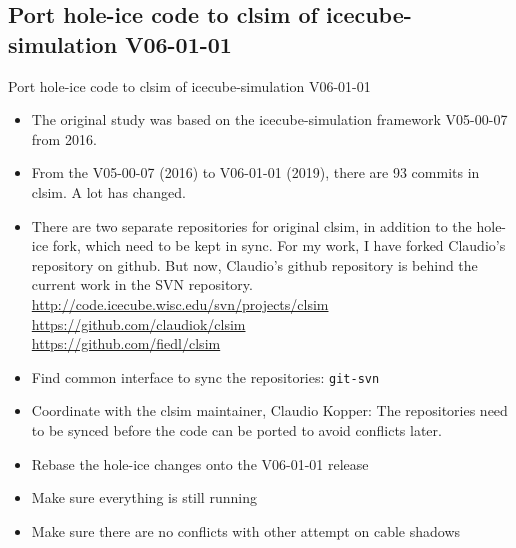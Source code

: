 \subsection{\inprogress Port hole-ice code to clsim of icecube-simulation V06-01-01}
\begin{frame}{\inprogress Port hole-ice code to clsim of icecube-simulation V06-01-01}
  \begin{itemize}
    \item The original study was based on the icecube-simulation framework V05-00-07 from 2016.
    \item From the V05-00-07 (2016) to V06-01-01 (2019), there are 93 commits in clsim. A lot has changed.
    \item There are two separate repositories for original clsim, in addition to the hole-ice fork, which need to be kept in sync. For my work, I have forked Claudio's repository on github. But now, Claudio's github repository is behind the current work in the SVN repository. \\
      \url{http://code.icecube.wisc.edu/svn/projects/clsim} \\
      \url{https://github.com/claudiok/clsim} \\
      \url{https://github.com/fiedl/clsim}
    \item[\done] Find common interface to sync the repositories: \texttt{git-svn}
    \item[\done] Coordinate with the clsim maintainer, Claudio Kopper: The repositories need to be synced before the code can be ported to avoid conflicts later.
    \item[\inprogress] Rebase the hole-ice changes onto the V06-01-01 release
    \item[\tobedone] Make sure everything is still running
    \item[\tobedone] Make sure there are no conflicts with other attempt on cable shadows
  \end{itemize}
\end{frame}

